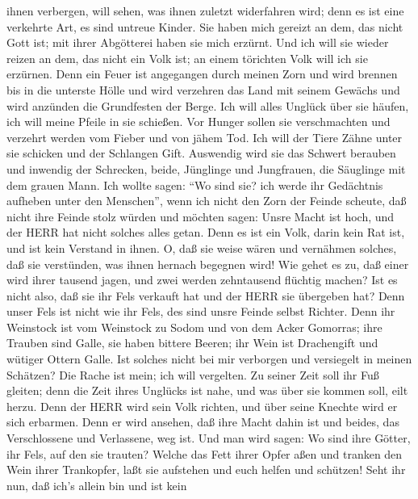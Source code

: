 ihnen verbergen, will sehen, was ihnen zuletzt widerfahren wird; denn es
ist eine verkehrte Art, es sind untreue Kinder.  Sie haben
mich gereizt an dem, das nicht Gott ist; mit ihrer Abgötterei haben sie
mich erzürnt. Und ich will sie wieder reizen an dem, das nicht ein Volk
ist; an einem törichten Volk will ich sie erzürnen.  Denn
ein Feuer ist angegangen durch meinen Zorn und wird brennen bis in die
unterste Hölle und wird verzehren das Land mit seinem Gewächs und wird
anzünden die Grundfesten der Berge.  Ich will alles Unglück
über sie häufen, ich will meine Pfeile in sie schießen. 
Vor Hunger sollen sie verschmachten und verzehrt werden vom Fieber und
von jähem Tod. Ich will der Tiere Zähne unter sie schicken und der
Schlangen Gift.  Auswendig wird sie das Schwert berauben
und inwendig der Schrecken, beide, Jünglinge und Jungfrauen, die
Säuglinge mit dem grauen Mann.  Ich wollte sagen: ``Wo sind
sie? ich werde ihr Gedächtnis aufheben unter den Menschen'',
 wenn ich nicht den Zorn der Feinde scheute, daß nicht ihre
Feinde stolz würden und möchten sagen: Unsre Macht ist hoch, und der
HERR hat nicht solches alles getan.  Denn es ist ein Volk,
darin kein Rat ist, und ist kein Verstand in ihnen.  O, daß
sie weise wären und vernähmen solches, daß sie verstünden, was ihnen
hernach begegnen wird!  Wie gehet es zu, daß einer wird
ihrer tausend jagen, und zwei werden zehntausend flüchtig machen? Ist es
nicht also, daß sie ihr Fels verkauft hat und der HERR sie übergeben
hat?  Denn unser Fels ist nicht wie ihr Fels, des sind
unsre Feinde selbst Richter.  Denn ihr Weinstock ist vom
Weinstock zu Sodom und von dem Acker Gomorras; ihre Trauben sind Galle,
sie haben bittere Beeren;  ihr Wein ist Drachengift und
wütiger Ottern Galle.  Ist solches nicht bei mir verborgen
und versiegelt in meinen Schätzen?  Die Rache ist mein; ich
will vergelten. Zu seiner Zeit soll ihr Fuß gleiten; denn die Zeit ihres
Unglücks ist nahe, und was über sie kommen soll, eilt herzu.
 Denn der HERR wird sein Volk richten, und über seine
Knechte wird er sich erbarmen. Denn er wird ansehen, daß ihre Macht
dahin ist und beides, das Verschlossene und Verlassene, weg ist.
 Und man wird sagen: Wo sind ihre Götter, ihr Fels, auf den
sie trauten?  Welche das Fett ihrer Opfer aßen und tranken
den Wein ihrer Trankopfer, laßt sie aufstehen und euch helfen und
schützen!  Seht ihr nun, daß ich's allein bin und ist kein
